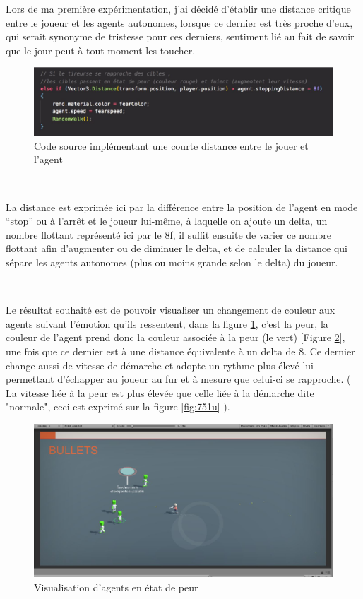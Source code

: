 Lors de ma première expérimentation, j’ai décidé d’établir une distance critique entre le joueur et les agents autonomes, lorsque ce dernier est très proche d’eux, qui serait synonyme de tristesse pour ces derniers, sentiment lié au fait de savoir que le jour peut à tout moment les toucher.


\begin{figure}[th]
\centering
\includegraphics{Figures/fonctdist.JPG}
\decoRule
\caption[Code source implémentant une courte distance ]{Code source implémentant une courte distance entre le jouer et l'agent}
\label{fig:751}
\end{figure}



~\par
La distance est exprimée ici par la différence entre la position de l’agent en mode “stop” ou à l'arrêt et le joueur lui-même, à laquelle on ajoute un delta, un nombre flottant représenté ici par le 8f, il suffit ensuite de varier ce nombre flottant afin d’augmenter ou de diminuer le delta, et de calculer la distance qui sépare les agents autonomes (plus ou moins grande selon le delta) du joueur. 

~\par
Le résultat souhaité est de pouvoir visualiser un changement de couleur aux agents suivant l’émotion qu’ils ressentent, dans la figure \ref{fig:751}, c’est la peur, la couleur de l’agent prend donc la couleur associée à la peur (le vert) [Figure \ref{fig:bichi1}], une fois que ce dernier est à une distance équivalente à un delta de 8. Ce dernier change aussi de vitesse de démarche et adopte un rythme plus élevé lui permettant d'échapper au joueur au fur et à mesure que celui-ci se rapproche. ( La vitesse liée à la peur est plus élevée que celle liée à la démarche dite "normale", ceci est exprimé sur la figure \ref{fig:751u} ).


\begin{figure}[th]
\centering
\includegraphics{Figures/bichi1.JPG}
\decoRule
\caption[Visualisation d'agents en état de peur]{Visualisation d'agents en état de peur}
\label{fig:bichi1}
\end{figure}



